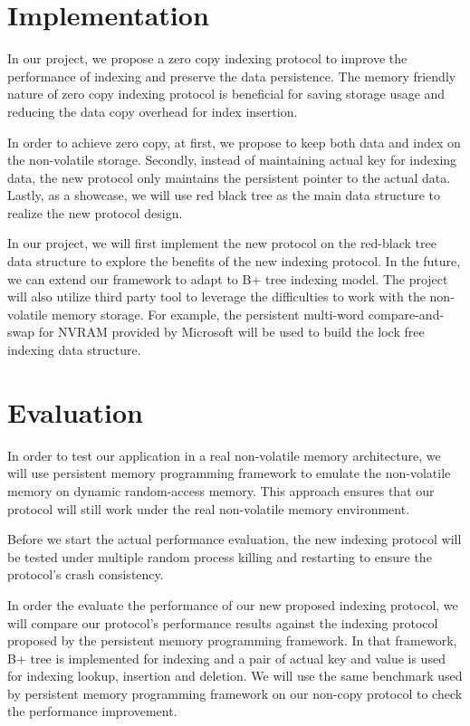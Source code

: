 \section{Implementation}
In our project, we propose a zero copy indexing protocol to improve the performance of indexing and preserve the data persistence. The memory friendly nature of zero copy indexing protocol is beneficial for saving storage usage and reducing the data copy overhead for index insertion. 

In order to achieve zero copy, at first, we propose to keep both data and index on the non-volatile storage. Secondly, instead of maintaining actual key for indexing data, the new protocol only maintains the persistent pointer to the actual data. Lastly, as a showcase, we will use red black tree as the main data structure to realize the new protocol design.

In our project, we will first implement the new protocol on the red-black tree data structure to explore the benefits of the new indexing protocol. In the future, we can extend our framework to adapt to B+ tree indexing model. The project will also utilize third party tool to leverage the difficulties to work with the non-volatile memory storage. For example, the persistent multi-word compare-and-swap for NVRAM provided by Microsoft will be used to build the lock free indexing data structure. 

\section{Evaluation}
In order to test our application in a real non-volatile memory architecture, we will use persistent memory programming framework to emulate the non-volatile memory on dynamic random-access memory. This approach ensures that our protocol will still work under the real non-volatile memory environment. 

Before we start the actual performance evaluation, the new indexing protocol will be tested under multiple random process killing and restarting to ensure the protocol's crash consistency. 

In order the evaluate the performance of our new proposed indexing protocol, we will compare our protocol's performance results against the indexing protocol proposed by the persistent memory programming framework. In that framework, B+ tree is implemented for indexing and a pair of actual key and value is used for indexing lookup, insertion and deletion. We will use the same benchmark used by persistent memory programming framework on our non-copy protocol to check the performance improvement. 

